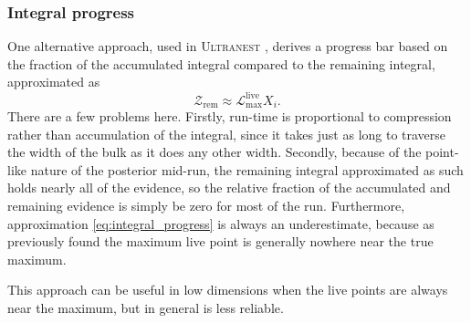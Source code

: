 \documentclass[usenatbib]{mnras}
\newcommand{\Like}{\mathcal{L}}
\begin{document}
\subsubsection{Integral progress}
One alternative approach, used in \textsc{Ultranest} \citep{ultranest}, derives a progress bar based on the fraction of the accumulated integral compared to the remaining integral, approximated as 
\begin{equation}\label{eq:integral_progress}
    \mathcal{Z}_\mathrm{rem} \approx \Like_\mathrm{max}^{\mathrm{live}} X_i.
\end{equation}
There are a few problems here. Firstly, run-time is proportional to compression rather than accumulation of the integral, since it takes just as long to traverse the width of the bulk as it does any other width. Secondly, because of the point-like nature of the posterior mid-run, the remaining integral approximated as such holds nearly all of the evidence, so the relative fraction of the accumulated and remaining evidence is simply be zero for most of the run. Furthermore, approximation \eqref{eq:integral_progress} is always an underestimate, because as previously found the maximum live point is generally nowhere near the true maximum.
\par
This approach can be useful in low dimensions when the live points are always near the maximum, but in general is less reliable.
\end{document}
